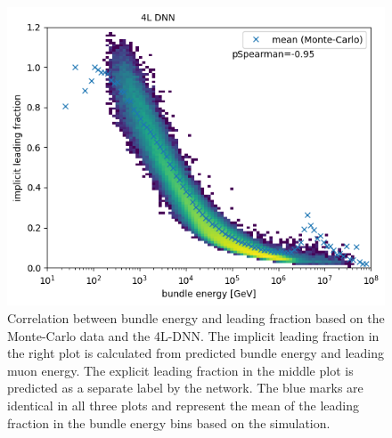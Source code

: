 \documentclass[
  tucolor,       %
  BCOR=12mm,     %
  parskip=half,  %
  open=any,      %
  cleardoublepage=plain,  %
]{tudothesis}
\begin{document}
\begin{figure}
\begin{minipage}[t]{0.32\textwidth}
    \includegraphics[width=\textwidth]{Plots/energy leading fraction correaltion small dnn implicit}
  \end{minipage}
  \caption{Correlation between bundle energy and leading fraction based on the Monte-Carlo data and the 4L-DNN. The implicit leading fraction in the right plot is calculated from predicted bundle energy and leading muon energy. The explicit leading fraction in the middle plot is predicted as a separate label by the network. The blue marks are identical in all three plots and represent the mean of the leading fraction in the bundle energy bins based on the simulation.}
  \label{fig:Correlation bundle leading}
\end{figure}
\end{document}
